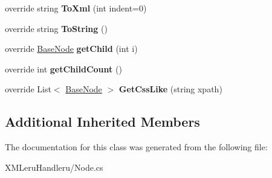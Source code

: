 \begin{DoxyCompactItemize}
\item 
\hypertarget{class_x_m_leru_handleru_1_1_node_a29a231aa34d23b491600f13916bcb5de}{}override string {\bfseries To\+Xml} (int indent=0)\label{class_x_m_leru_handleru_1_1_node_a29a231aa34d23b491600f13916bcb5de}

\item 
\hypertarget{class_x_m_leru_handleru_1_1_node_aa35d6d52814845f0c3f72ccdcdc20d13}{}override string {\bfseries To\+String} ()\label{class_x_m_leru_handleru_1_1_node_aa35d6d52814845f0c3f72ccdcdc20d13}

\item 
\hypertarget{class_x_m_leru_handleru_1_1_node_ab8e1bbaf7d37712935a11895e64f388b}{}override \hyperlink{class_x_m_leru_handleru_1_1_base_node}{Base\+Node} {\bfseries get\+Child} (int i)\label{class_x_m_leru_handleru_1_1_node_ab8e1bbaf7d37712935a11895e64f388b}

\item 
\hypertarget{class_x_m_leru_handleru_1_1_node_a7ae9558a47ff7f2b57fb181ae0979f98}{}override int {\bfseries get\+Child\+Count} ()\label{class_x_m_leru_handleru_1_1_node_a7ae9558a47ff7f2b57fb181ae0979f98}

\item 
\hypertarget{class_x_m_leru_handleru_1_1_node_a026cf872ba21b782d2e1b7919660294e}{}override List$<$ \hyperlink{class_x_m_leru_handleru_1_1_base_node}{Base\+Node} $>$ {\bfseries Get\+Css\+Like} (string xpath)\label{class_x_m_leru_handleru_1_1_node_a026cf872ba21b782d2e1b7919660294e}

\end{DoxyCompactItemize}
\subsection*{Additional Inherited Members}


The documentation for this class was generated from the following file\+:\begin{DoxyCompactItemize}
\item 
X\+M\+Leru\+Handleru/Node.\+cs\end{DoxyCompactItemize}

